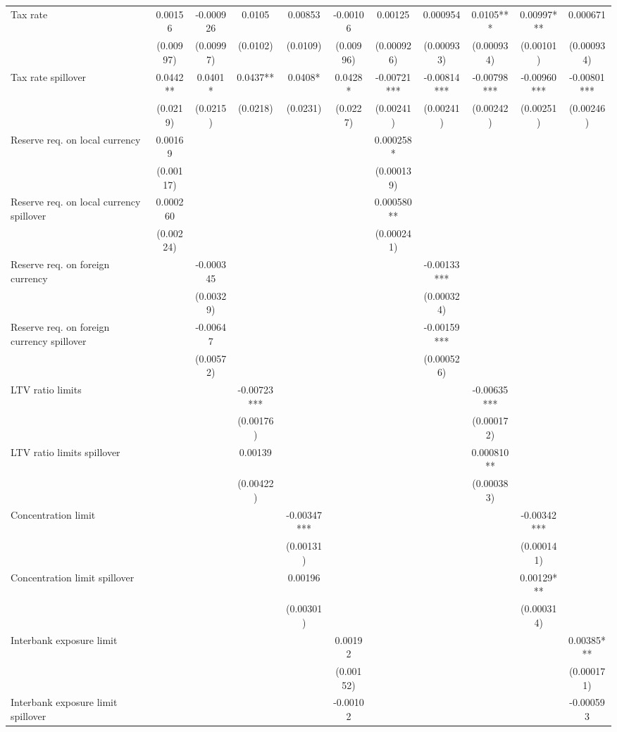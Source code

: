 \begin{tabular}{lcccccccccc}
Tax rate & 0.00156 & -0.000926 & 0.0105 & 0.00853 & -0.00106 & 0.00125 & 0.000954 & 0.0105*** & 0.00997*** & 0.000671 \\
 & (0.00997) & (0.00997) & (0.0102) & (0.0109) & (0.00996) & (0.000926) & (0.000933) & (0.000934) & (0.00101) & (0.000934) \\
Tax rate spillover & 0.0442** & 0.0401* & 0.0437** & 0.0408* & 0.0428* & -0.00721*** & -0.00814*** & -0.00798*** & -0.00960*** & -0.00801*** \\
 & (0.0219) & (0.0215) & (0.0218) & (0.0231) & (0.0227) & (0.00241) & (0.00241) & (0.00242) & (0.00251) & (0.00246) \\
Reserve req. on local currency & 0.00169 &  &  &  &  & 0.000258* &  &  &  &  \\
 & (0.00117) &  &  &  &  & (0.000139) &  &  &  &  \\
Reserve req. on local currency spillover & 0.000260 &  &  &  &  & 0.000580** &  &  &  &  \\
 & (0.00224) &  &  &  &  & (0.000241) &  &  &  &  \\
Reserve req. on foreign currency &  & -0.000345 &  &  &  &  & -0.00133*** &  &  &  \\
 &  & (0.00329) &  &  &  &  & (0.000324) &  &  &  \\
Reserve req. on foreign currency spillover &  & -0.00647 &  &  &  &  & -0.00159*** &  &  &  \\
 &  & (0.00572) &  &  &  &  & (0.000526) &  &  &  \\
LTV ratio limits &  &  & -0.00723*** &  &  &  &  & -0.00635*** &  &  \\
 &  &  & (0.00176) &  &  &  &  & (0.000172) &  &  \\
LTV ratio limits spillover &  &  & 0.00139 &  &  &  &  & 0.000810** &  &  \\
 &  &  & (0.00422) &  &  &  &  & (0.000383) &  &  \\
Concentration limit &  &  &  & -0.00347*** &  &  &  &  & -0.00342*** &  \\
 &  &  &  & (0.00131) &  &  &  &  & (0.000141) &  \\
Concentration limit spillover &  &  &  & 0.00196 &  &  &  &  & 0.00129*** &  \\
 &  &  &  & (0.00301) &  &  &  &  & (0.000314) &  \\
Interbank exposure limit &  &  &  &  & 0.00192 &  &  &  &  & 0.00385*** \\
 &  &  &  &  & (0.00152) &  &  &  &  & (0.000171) \\
Interbank exposure limit spillover &  &  &  &  & -0.00102 &  &  &  &  & -0.000593 \\

\end{tabular}
